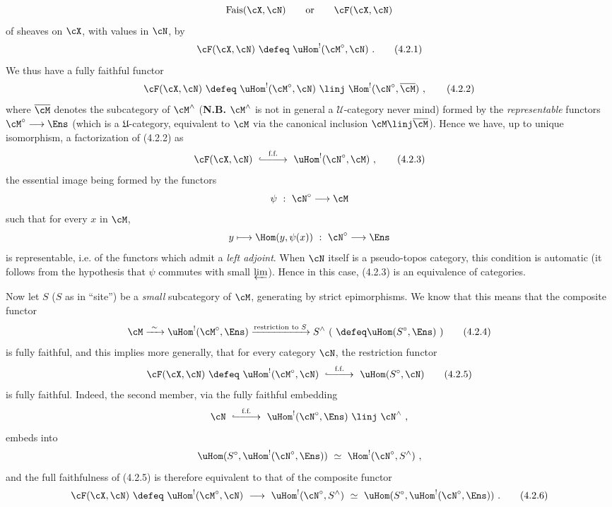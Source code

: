 \[
\mathrm{Fais}(\cX,\cN) \qquad \text{or} \qquad \cF(\cX,\cN)
\]
of sheaves on $\cX$, with values in $\cN$, by
\[
\cF(\cX,\cN) \ \defeq\ \uHom^{!}(\cM^{\circ},\cN) \ .
\tag*{(4.2.1)}
\]
We thus have a fully faithful functor
\[
\cF(\cX,\cN) \ \defeq\ \uHom^{!}(\cM^{\circ},\cN) \ \linj\ \Hom^{!}(\cN^{\circ},\overline{\cM}) \ ,
\tag*{(4.2.2)}
\]
where $\overline{\cM}$ denotes the subcategory of $\cM^{\wedge}$ (\textbf{N.B.} $\cM^{\wedge}$ is not in general a $\mathcal{U}$-category never mind) formed by the \textit{representable} functors $\cM^{\circ}\longrightarrow\Ens$ (which is a $\mathfrak{U}$-category, equivalent to $\cM$ via the canonical inclusion $\cM \linj \overline{\cM}$). Hence we have, up to unique isomorphism, a factorization of (4.2.2) as
\[
\cF(\cX,\cN) \ \overset{\text{f.f.}}{\lhook\joinrel\relbar\joinrel\relbar\joinrel\longrightarrow}\ \uHom^{!}(\cN^{\circ},\cM) \ ,
\tag*{(4.2.3)}
\]
the essential image being formed by the functors
\[
\psi \ :\ \cN^{\circ} \longrightarrow \cM
\]
such that for every $x$ in $\cM$,
\[
y \longmapsto \Hom(y,\psi(x)) \ :\ \cN^{\circ} \longrightarrow \Ens
\]
is representable, i.e. of the functors which
admit a \textit{left adjoint}. When $\cN$ itself is a pseudo-topos category, this condition is automatic (it follows from the hypothesis that $\psi$ commutes with small $\varprojlim$). Hence in this case, (4.2.3) is an equivalence of categories.

Now let $S$ ($S$ as in ``site'') be a \textit{small} subcategory of $\cM$, generating by strict epimorphisms. We know that this means that the composite functor
\[
\cM \xrightarrow{\ \sim\ } \uHom^{!}(\cM^{\circ},\Ens) \xrightarrow{\text{restriction to } S} S^{\wedge} \ (\ \defeq \uHom(S^{\circ},\Ens)\ )
\tag*{(4.2.4)}
\]
is fully faithful, and this implies more generally, that for every category $\cN$, the restriction functor
\[
\cF(\cX,\cN) \ \defeq\ \uHom^{!}(\cM^{\circ},\cN) \ \overset{\text{f.f.}}{\lhook\joinrel\relbar\joinrel\relbar\joinrel\longrightarrow}\ \uHom(S^{\circ},\cN)
\tag*{(4.2.5)}
\]
is fully faithful. Indeed, the second member, via the fully faithful embedding
\[
\cN \ \overset{\text{f.f.}}{\lhook\joinrel\relbar\joinrel\relbar\joinrel\longrightarrow}\ \uHom^{!}(\cN^{\circ},\Ens) \ \linj\ \cN^{\wedge} \ ,
\]
embeds into
\[
\uHom(S^{\circ},\uHom^{!}(\cN^{\circ},\Ens)) \ \simeq\ \Hom^{!}(\cN^{\circ},S^{\wedge}) \ ,
\]
and the full faithfulness of (4.2.5) is therefore equivalent to that of the composite functor
\[
\cF(\cX,\cN) \ \defeq\ \uHom^{!}(\cM^{\circ},\cN) \ \longrightarrow\ \uHom^{!}(\cN^{\circ},S^{\wedge}) \ \simeq\ \uHom(S^{\circ},\uHom^{!}(\cN^{\circ},\Ens)) \ .
\tag*{(4.2.6)}
\]

